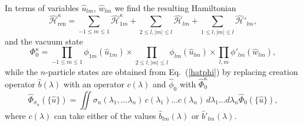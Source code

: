 \documentclass[12pt]{article}
\newcommand{\HH}{\mathscr{H}}
\begin{document}
	In terms of variables
$ \hat{u}_{lm} $,
$ \hat{w}_{lm} $
	we find the resulting Hamiltonian
\begin{equation*}
    \hat{\HH}_{\text{ren}}^{\kappa}
	= \sum_{-1\leq m\leq 1} \hat{\HH}_{1m}^{\kappa}
	+ \sum_{2\leq l, |m|\leq l} \hat{\HH}_{lm}
	+ \sum_{1\leq l, |m|\leq l} \hat{\HH}'_{lm} ,
\end{equation*}
	and the vacuum state
\begin{equation*}
    \Phi_{0}^{\kappa} = \prod_{-1\leq m \leq 1} \phi_{1m}(\hat{u}_{1m}) \times
    \prod_{2\leq l, |m|\leq l} \phi_{lm}(\hat{u}_{lm}) \times
	\prod_{l,m} \phi'_{lm}(\hat{w}_{lm}) ,
\end{equation*}
	while the
$ n $-particle states are obtained from
Eq.~(\ref{hatphi})
	by replacing creation operator
$ \hat{b}(\lambda) $ with an operator
$ c(\lambda) $
    and
$ \hat{\phi}_{0} $
    with
$ \hat{\Phi}_{0}^{\kappa} $
\begin{equation*}
    \hat{\Phi}_{\sigma_{n}}(\{\hat{u}\}) = \iint
    \sigma_{n} (\lambda_{1},\ldots \lambda_{n}) \,
	c(\lambda_{1}) \ldots c(\lambda_{n}) \,
    d\lambda_{1} \ldots d\lambda_{n} \hat{\Phi}_{0}(\{\hat{u}\}) ,
\end{equation*}
    where
$ c(\lambda) $
    can take either of the values
$ \hat{b}_{lm}(\lambda) $ or $ \hat{b}'_{lm}(\lambda) $.




\end{document}
